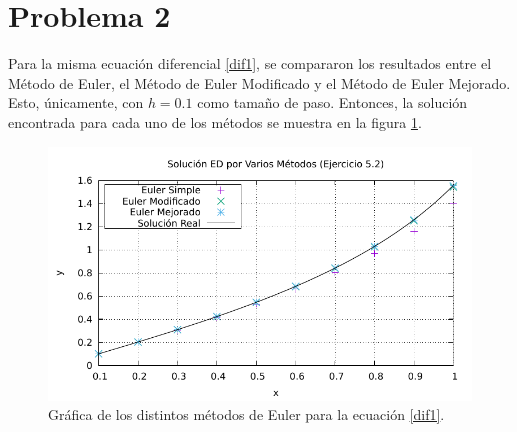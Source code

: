 \section*{Problema 2}
Para la misma ecuación diferencial \eqref{dif1}, se compararon los resultados entre el Método de Euler, el Método de Euler Modificado y el Método de Euler Mejorado. Esto, únicamente, con $h = 0.1$ como tamaño de paso. Entonces, la solución encontrada para cada uno de los métodos se muestra en la figura \ref{ej2}.

\begin{figure}[H]
	\centering
	\includegraphics[scale=1]{../img/ej5-2.pdf}
	\caption{Gráfica de los distintos métodos de Euler para la ecuación \eqref{dif1}.}
	\label{ej2}
\end{figure}


